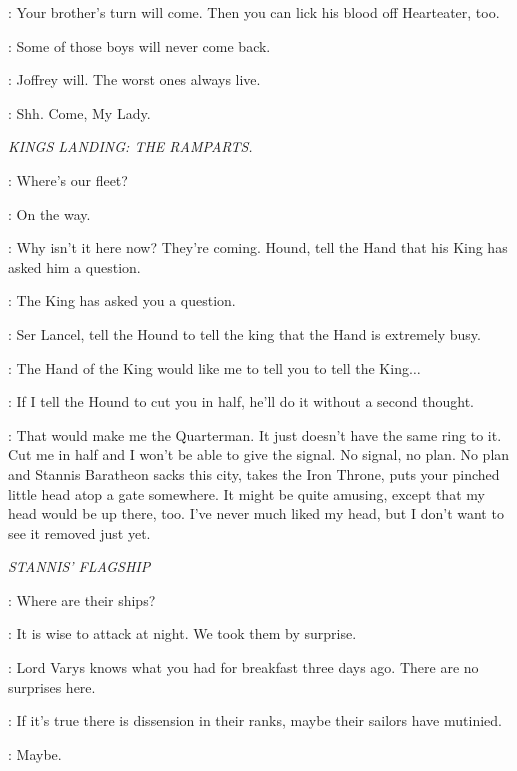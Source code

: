 \JOFFREY: Your brother's turn will come. Then you can lick his blood off Hearteater, too. 


\SHAE: Some of those boys will never come back. 

\SANSA: Joffrey will. The worst ones always live. 

\SHAE: Shh. Come, My Lady. 


\scene

\textit{KINGS LANDING: THE RAMPARTS.}


\LANCEL: Where's our fleet? 

\TYRION: On the way. 

\JOFFREY: Why isn't it here now? They're coming. Hound, tell the Hand that his King has asked him a question. 

\HOUND: The King has asked you a question. 

\TYRION: Ser Lancel, tell the Hound to tell the king that the Hand is extremely busy. 

\LANCEL: The Hand of the King would like me to tell you to tell the King$\ldots$  

\JOFFREY: If I tell the Hound to cut you in half, he'll do it without a second thought. 

\TYRION: That would make me the Quarterman. It just doesn't have the same ring to it. Cut me in half and I won't be able to give the signal. No signal, no plan. No plan and Stannis Baratheon sacks this city, takes the Iron Throne, puts your pinched little head atop a gate somewhere. It might be quite amusing, except that my head would be up there, too. I've never much liked my head, but I don't want to see it removed just yet. 


\scene

\textit{STANNIS' FLAGSHIP}


\DAVOS: Where are their ships? 

\MATTHOS: It is wise to attack at night. We took them by surprise. 

\DAVOS: Lord Varys knows what you had for breakfast three days ago.  There are no surprises here. 

\MATTHOS: If it's true there is dissension in their ranks, maybe their sailors have mutinied. 

\DAVOS: Maybe. 


